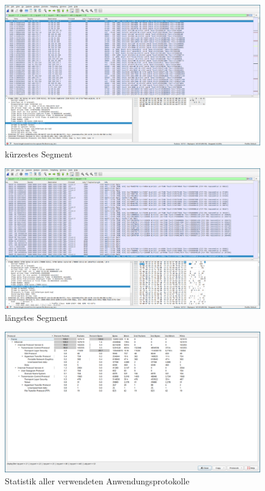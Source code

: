 \FloatBarrier

\begin{figure}[p]
    \centering
    \includegraphics[width=1\textwidth]{./assets/5.1.b.1.png}
    \caption{kürzestes Segment}
    \label{fig:5.1.b.1}
\end{figure}

\begin{figure}[p]
    \centering
    \includegraphics[width=1\textwidth]{./assets/5.1.b.2.png}
    \caption{längstes Segment}
    \label{fig:5.1.b.2}
\end{figure}

\FloatBarrier

\begin{figure}[p]
    \centering
    \includegraphics[width=1\textwidth]{./assets/5.1.c.png}
    \caption{Statistik aller verwendeten Anwendungsprotokolle}
    \label{fig:5.1.c}
\end{figure}

\FloatBarrier
